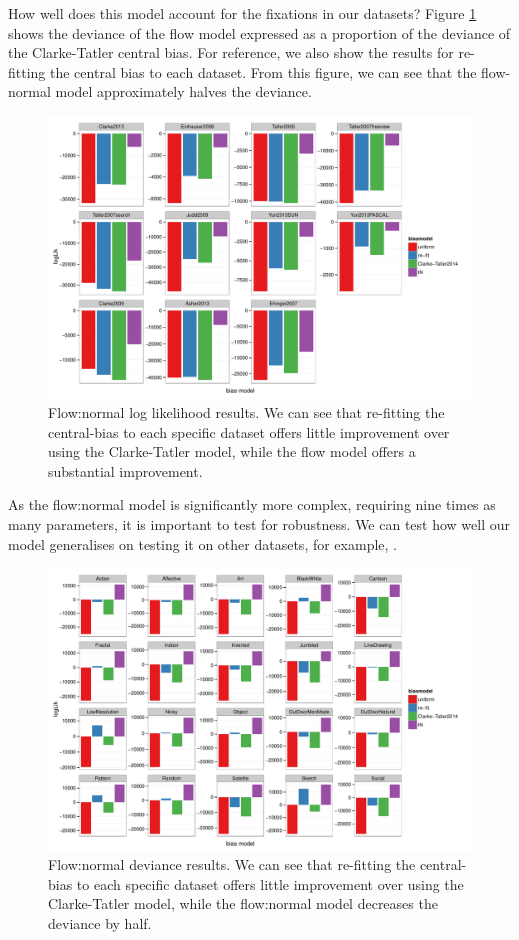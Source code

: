 How well does this model account for the fixations in our datasets? Figure \ref{fig:nFlowDevAll} shows the deviance of the flow model expressed as a proportion of the deviance of the Clarke-Tatler central bias. For reference, we also show the results for re-fitting the central bias to each dataset. From this figure, we can see that the flow-normal model approximately halves the deviance. 

\begin{figure}
\centering
 \includegraphics[width=12cm]{../scripts/flow/figs/llh_ALL.pdf}
\caption{Flow:normal log likelihood results. We can see that re-fitting the central-bias to each specific dataset offers little improvement over using the Clarke-Tatler model, while the flow model offers a substantial improvement.}
\label{fig:nFlowDevAll}
\end{figure}

As the flow:normal model is significantly more complex, requiring nine times as many parameters, it is important to test for robustness. We can test how well our model generalises on testing it on other datasets, for example, \cite{borji2015}. 


\begin{figure}
\centering
 \includegraphics[width=12cm]{../scripts/flow/figs/llh_Borji.pdf}
\caption{Flow:normal deviance results. We can see that re-fitting the central-bias to each specific dataset offers little improvement over using the Clarke-Tatler model, while the flow:normal model decreases the deviance by half.}
\label{fig:nFlowDevBorji}
\end{figure}

